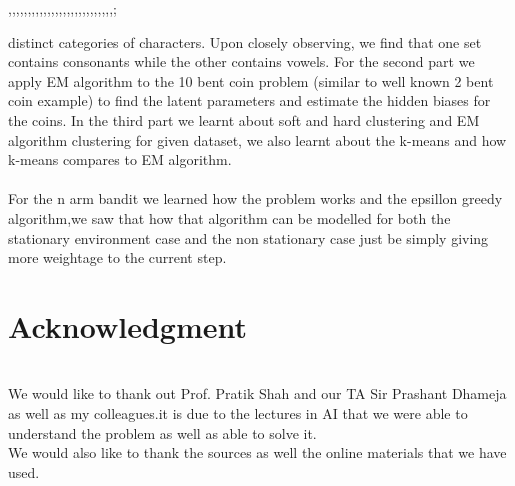 ,,,,,,,,,,,,,,,,,,,,,,,,,,,;\documentclass[conference]{IEEEtran}
\begin{document}
distinct categories of characters. Upon closely observing, we
find that one set contains consonants while the other contains
vowels. For the second part we apply EM algorithm to the 10
bent coin problem (similar to well known 2 bent coin example)
to find the latent parameters and estimate the hidden biases
for the coins. In the third part we learnt about soft and hard
clustering and EM algorithm clustering for given dataset, we
also learnt about the k-means and how k-means compares to
EM algorithm.
\\
\\
For the n arm bandit we learned how the problem works and
the epsillon greedy algorithm,we saw that how that algorithm
can be modelled for both the stationary environment case and
the non stationary case just be simply giving more weightage
to the current step.


\section*{Acknowledgment}
\\
We would like to thank out Prof. Pratik Shah and our TA Sir Prashant Dhameja as well as my colleagues.it is due to the lectures in AI that we were able to understand the problem as well as able to solve it.
\\
We would also like to thank the sources as well the online materials that we have used.
\end{document}
